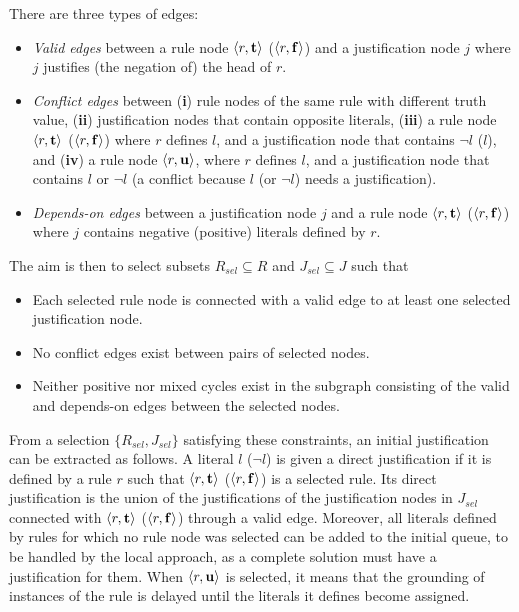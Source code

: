 \documentclass[11pt]{article}
\newcommand{\m}[1]{\ensuremath{#1}\xspace}
\newcommand{\trval}[1]{\m{{\bf #1}}}
\newcommand{\ltrue}{\trval{t}}
\newcommand{\lfalse}{\trval{f}}
\newcommand{\lunkn}{\trval{u}}
\newcommand{\tuple}[1]{\m{\left \langle #1 \right \rangle }}
\theoremstyle{plain}
\theoremstyle{definition}
\theoremstyle{example_basic}
\theoremstyle{example_contd}
\theoremstyle{plain}
\newcommand{\tbf}[1]{\textbf{#1}}
\newcommand{\change}[1]{#1}
\begin{document}
\change{There are three types of edges: 
\begin{itemize}
  \item \emph{Valid edges} between a rule node $\tuple{r,\ltrue}$ ($\tuple{r,\lfalse}$) and a justification node $j$ where $j$ justifies (the negation of) the head of $r$.
  \item \emph{Conflict edges} between (\tbf{i}) rule nodes of the same
    rule \change{with different truth value}, (\tbf{ii}) justification nodes that contain opposite
    literals, (\tbf{iii}) a rule node $\tuple{r,\ltrue}$ 
    ($\tuple{r, \lfalse}$) where $r$ defines
    $l$, and a justification node that contains $\lnot l$ ($l$), and
    (\tbf{iv}) a rule node $\tuple{r, \lunkn}$, where $r$ defines
    $l$, and a justification node that contains $l$ or $\lnot l$ (a
    conflict because $l$ (or $\lnot l$) needs a justification).
  \item \emph{Depends-on edges} between a justification node $j$ and a rule node $\tuple{r,\ltrue}$ ($\tuple{r, \lfalse}$) where $j$ contains negative (positive) literals defined by $r$. 
\end{itemize}
The aim is then to select subsets $R_{sel} \subseteq R$ and $J_{sel} \subseteq J$ such that
\begin{itemize}
\item Each selected rule node is connected with a valid edge to at least
  one selected justification node.
  \item No conflict edges exist between pairs of selected nodes.
  \item Neither positive nor mixed cycles exist in the subgraph
    consisting of the valid and depends-on edges between the selected nodes. 
\end{itemize}}
\change{From a selection $\{R_{sel}, J_{sel}\}$ satisfying these
  constraints, an initial justification \jgraph can be extracted as follows. A
  literal $l$ ($\lnot l$) is given a direct justification if it is
  defined by a rule $r$ such that $\tuple{r,\ltrue}$
  ($\tuple{r,\lfalse}$) is a selected rule. Its direct justification
  is  the union of the justifications of the justification nodes in
  $J_{sel}$ connected with $\tuple{r,\ltrue}$
  ($\tuple{r,\lfalse}$) through a valid edge. Moreover, all literals
  defined by rules for which no rule node was selected can be added
  to the initial \changes queue, to be handled by the local approach,
  as a complete solution must have a justification for them. When
  $\tuple{r,\lunkn}$ is selected, it means that the grounding of instances of the rule is delayed until the literals it defines become assigned.}
\end{document}
